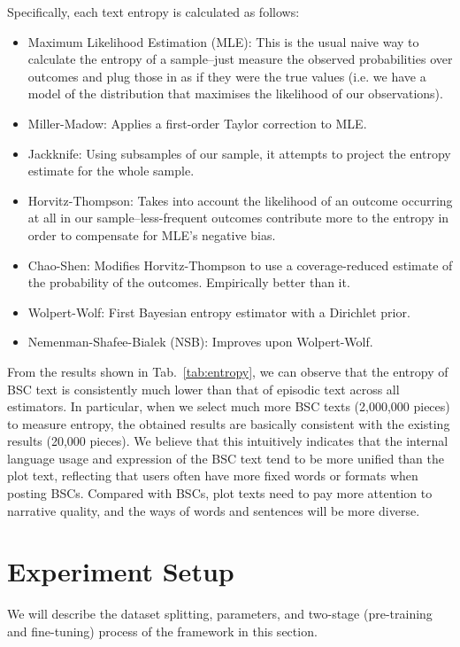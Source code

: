 Specifically, each text entropy is calculated as follows:
\begin{itemize}
    \item Maximum Likelihood Estimation (MLE): This is the usual naive way to calculate the entropy of a sample--just measure the observed probabilities over outcomes and plug those in as if they were the true values (i.e. we have a model of the distribution that maximises the likelihood of our observations).
    \item Miller-Madow: Applies a first-order Taylor correction to MLE.
    \item Jackknife: Using subsamples of our sample, it attempts to project the entropy estimate for the whole sample.
    \item Horvitz-Thompson: Takes into account the likelihood of an outcome occurring at all in our sample--less-frequent outcomes contribute more to the entropy in order to compensate for MLE's negative bias.
    \item Chao-Shen: Modifies Horvitz-Thompson to use a coverage-reduced estimate of the probability of the outcomes. Empirically better than it.
    \item Wolpert-Wolf: First Bayesian entropy estimator with a Dirichlet prior.
    \item Nemenman-Shafee-Bialek (NSB): Improves upon Wolpert-Wolf.
\end{itemize}

From the results shown in Tab.~\ref{tab:entropy}, we can observe that the entropy of BSC text is consistently much lower than that of episodic text across all estimators.
In particular, when we select much more BSC texts (2,000,000 pieces) to measure entropy, the obtained results are basically consistent with the existing results (20,000 pieces).
We believe that this intuitively indicates that the internal language usage and expression of the BSC text tend to be more unified than the plot text, reflecting that users often have more fixed words or formats when posting BSCs.
Compared with BSCs, plot texts need to pay more attention to narrative quality, and the ways of words and sentences will be more diverse.

\section{Experiment Setup}
\label{sec:app_experiment_setup}

We will describe the dataset splitting, parameters, and two-stage (pre-training and fine-tuning) process of the framework in this section.


